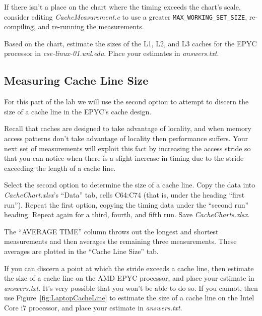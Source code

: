 If there isn't a place on the chart where the timing exceeds the chart's scale,
consider editing \textit{CacheMeasurement.c} to use a greater
\lstinline{MAX_WORKING_SET_SIZE}, re-compiling, and re-running the measurements.

Based on the chart, estimate the sizes of the L1, L2, and L3 caches for the
EPYC processor in \textit{cse-linux-01.unl.edu}. Place your estimates in
\textit{answers.txt}.

\subsection{Measuring Cache Line Size}

For this part of the lab we will use the second option to attempt to discern the
size of a cache line in the EPYC's cache design.

Recall that caches are designed to take advantage of locality, and when memory
access patterns don't take advantage of locality then performance suffers. Your
next set of measurements will exploit this fact by increasing the access stride
so that you can notice when there is a slight increase in timing due to the
stride exceeding the length of a cache line.

Select the second option to determine the size of a cache line. Copy the data
into \textit{CacheChart.xlsx}'s ``Data'' tab, cells C64:C74 (that is, under the
heading ``first run''). Repeat the first option, copying the timing data under
the ``second run'' heading. Repeat again for a third, fourth, and fifth run.
Save \textit{CacheCharts.xlsx}.

The ``AVERAGE TIME'' column throws out the longest and shortest measurements
and then averages the remaining three measurements. These averages are plotted
in the ``Cache Line Size'' tab.

If you can discern a point at which the stride exceeds a cache line, then
estimate the size of a cache line on the AMD EPYC processor, and place your
estimate in \textit{answers.txt}. It's very possible that you won't be able to
do so. If you cannot, then use Figure~\ref{fig:LaptopCacheLine} to estimate the
size of a cache line on the Intel Core i7 processor, and place your estimate in
\textit{answers.txt}.


